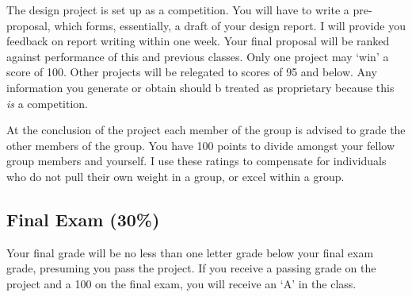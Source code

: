 \documentclass[10pt]{article}
\begin{document}
The design project is set up as a competition. You will have to write a pre-proposal, which forms, essentially, a draft of your design report. I will provide you feedback on report writing within one week. Your final proposal will be ranked against performance of this and previous classes. Only one project may `win' a score of 100. Other projects will be relegated to scores of 95 and below. Any information you generate or obtain should b treated as proprietary because this \emph{is} a competition.  

At the conclusion of the project each member of the group is advised to grade the other members of the group. You have 100 points to divide amongst your fellow group members and yourself. I use these ratings to compensate for individuals who do not pull their own weight in a group, or excel within a group. 

\subsection*{Final Exam (30\%)}
Your final grade will be no less than one letter grade below your final exam grade, presuming you pass the project. If you receive a passing grade on the  project and a 100 on the final exam, you will receive an `A' in the class. 
\end{document}
